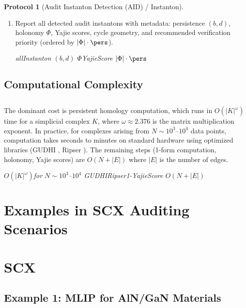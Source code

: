 \documentclass[11pt,a4paper]{article}
\theoremstyle{plain}
\theoremstyle{definition}
\newtheorem{protocol}[theorem]{Protocol}
\begin{document}
\begin{protocol}[Audit Instanton Detection (AID) / Instanton]
\begin{enumerate}[label=\arabic*.]
        \textit{eachInstanton $\gamma_j$ $\gamma_j$ ``'' $\gamma_j$  $\Sigma_j$\textbf{}}

  \item Report all detected audit instantons with metadata:
        persistence $(b, d)$, holonomy $\Phi$, Yajie scores, cycle 
        geometry, and recommended verification priority (ordered by 
        $|\Phi| \cdot \pers$).
        
        \textit{allInstanton $(b, d)$ $\Phi$YajieScore $|\Phi| \cdot \pers$ }
\end{enumerate}
\end{protocol}

\subsection{Computational Complexity}
\subsection*{}

The dominant cost is persistent homology computation, which runs in 
$O(|K|^{\omega})$ time for a simplicial complex $K$, where 
$\omega \approx 2.376$ is the matrix multiplication exponent. In practice, 
for complexes arising from $N \sim 10^3$–$10^4$ data points, computation 
takes seconds to minutes on standard hardware using optimized libraries 
(GUDHI \cite{gudhi}, Ripser \cite{bauer2021}). The remaining steps 
(1-form computation, holonomy, Yajie scores) are $O(N + |E|)$ where $|E|$ 
is the number of edges.

\bigskip
\noindent
\textit{ $O(|K|^{\omega})$for $N \sim 10^3$–$10^4$ GUDHIRipser1-YajieScore $O(N + |E|)$}

\section{Examples in SCX Auditing Scenarios}
\section*{SCX}

\subsection{Example 1: MLIP for AlN/GaN Materials}
\end{document}
